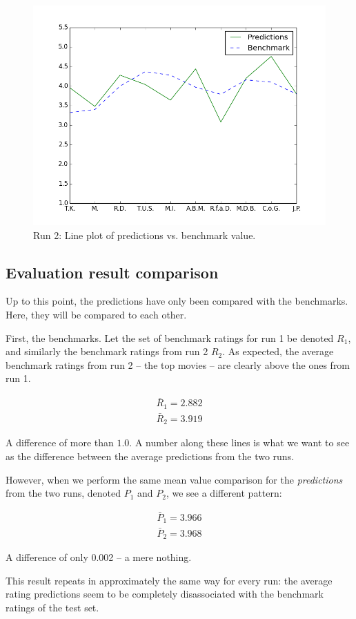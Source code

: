 \begin{figure}[h]
  \centering
    \includegraphics[width=.8\textwidth]{Figures/plots/predictions_benchmark_pop}
  \caption{Run 2: Line plot of predictions vs. benchmark value.}
  \label{fig:predictions_benchmark_pop}
\end{figure}

\subsection{Evaluation result comparison} %
\label{sub:evaluation_result_comparison}

Up to this point, the predictions have only been compared with the benchmarks. Here, they will be compared to each other.

First, the benchmarks. Let the set of benchmark ratings for run 1 be denoted $R_1$, and similarly the benchmark ratings from run 2 $R_2$. As expected, the average benchmark ratings from run 2 -- the top movies -- are clearly above the ones from run 1.

\begin{align}
  \bar{R}_1 = 2.882 \\
  \bar{R}_2 = 3.919
\end{align}

A difference of more than $1.0$. A number along these lines is what we want to see as the difference between the average predictions from the two runs.

However, when we perform the same mean value comparison for the \emph{predictions} from the two runs, denoted $P_1$ and $P_2$, we see a different pattern:

\begin{align}
  \bar{P}_1 = 3.966 \\
  \bar{P}_2 = 3.968
\end{align}

A difference of only 0.002 -- a mere nothing.

This result repeats in approximately the same way for every run: the average rating predictions seem to be completely disassociated with the benchmark ratings of the test set.

